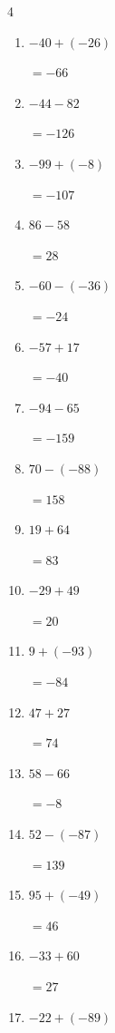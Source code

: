\begin{multicols}{4}
\begin{enumerate}
        $=-25$

  \item $-40+(-26)$

        $=-66$

  \item $-44-82$

        $=-126$

  \item $-99+(-8)$

        $=-107$

  \item $86-58$

        $=28$

  \item $-60-(-36)$

        $=-24$

  \item $-57+17$

        $=-40$

  \item $-94-65$

        $=-159$

  \item $70-(-88)$

        $=158$

  \item $19+64$

        $=83$

  \item $-29+49$

        $=20$

  \item $9+(-93)$

        $=-84$

  \item $47+27$

        $=74$

  \item $58-66$

        $=-8$

  \item $52-(-87)$

        $=139$

\columnbreak %

  \item $95+(-49)$

        $=46$

  \item $-33+60$

        $=27$

  \item $-22+(-89)$


\end{enumerate}
\end{multicols}
